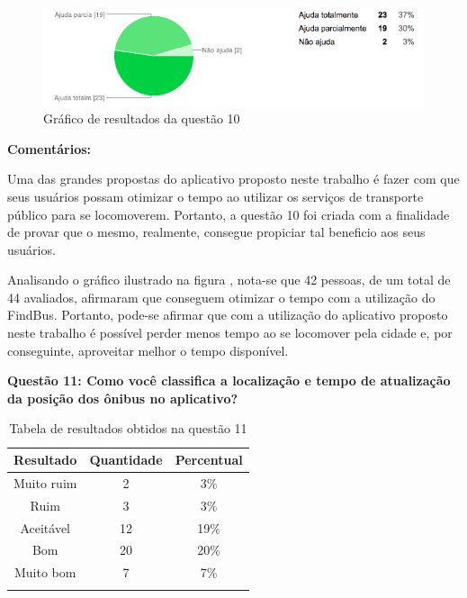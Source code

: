 \begin{figure}[h]
\begin{center}
  \includegraphics[width=16cm]{images/graficos/questao10.png}
  \caption{Gráfico de resultados da questão 10}
  \label{fig:questao10}
\end{center}
\end{figure}

\textbf{Comentários:}

Uma das grandes propostas do aplicativo proposto neste trabalho é fazer com que seus usuários possam otimizar o tempo ao utilizar os serviços de transporte público para se locomoverem. Portanto, a questão 10 foi criada com a finalidade de provar que o mesmo, realmente, consegue propiciar tal beneficio aos seus usuários. 
	
Analisando o gráfico ilustrado na figura , nota-se que 42 pessoas, de um total de 44 avaliados, afirmaram que conseguem otimizar o tempo com a utilização do FindBus. Portanto, pode-se afirmar que com a utilização do aplicativo proposto neste trabalho é possível perder menos tempo ao se locomover pela cidade e, por conseguinte, aproveitar melhor o tempo disponível.\newline

\textbf{Questão 11: Como você classifica a localização e tempo de atualização da posição dos ônibus no aplicativo?}

\begin{center}
\begin{longtable}{c|c|c}
\hline
    \multicolumn{1}{c}{\textbf{Resultado}} & \multicolumn{1}{c}{\textbf{Quantidade}} & \multicolumn{1}{c}{\textbf{Percentual}} \\
\hline
    Muito ruim & 2 &  3\%\\
    \hline
    Ruim & 3 & 3\%\\
    \hline
    Aceitável & 12 &  19\%\\
    \hline
    Bom & 20 & 20\%\\
    \hline
    Muito bom & 7 & 7\%\\
    \hline
\caption{Tabela de resultados obtidos na questão 11}
\label{tabq11}
\end{longtable}
\end{center}

